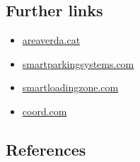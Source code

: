 \documentclass[
]{book}
\providecommand{\tightlist}{%
  \setlength{\itemsep}{0pt}\setlength{\parskip}{0pt}}
\begin{document}
\hypertarget{further-links-29}{%
\subsection*{Further links}\label{further-links-29}}

\begin{itemize}
\tightlist
\item
  \href{https://www.areaverda.cat/index.php/es}{areaverda.cat}
\item
  \href{https://smartparkingsystems.com/en/loading-parking-bay-management/}{smartparkingsystems.com}
\item
  \href{https://www.smartloadingzone.com/en_us/}{smartloadingzone.com}
\item
  \href{https://www.coord.com/blog/comparing-loading-zones}{coord.com}
\end{itemize}

\hypertarget{references-32}{%
\subsection*{References}\label{references-32}}
\end{document}
